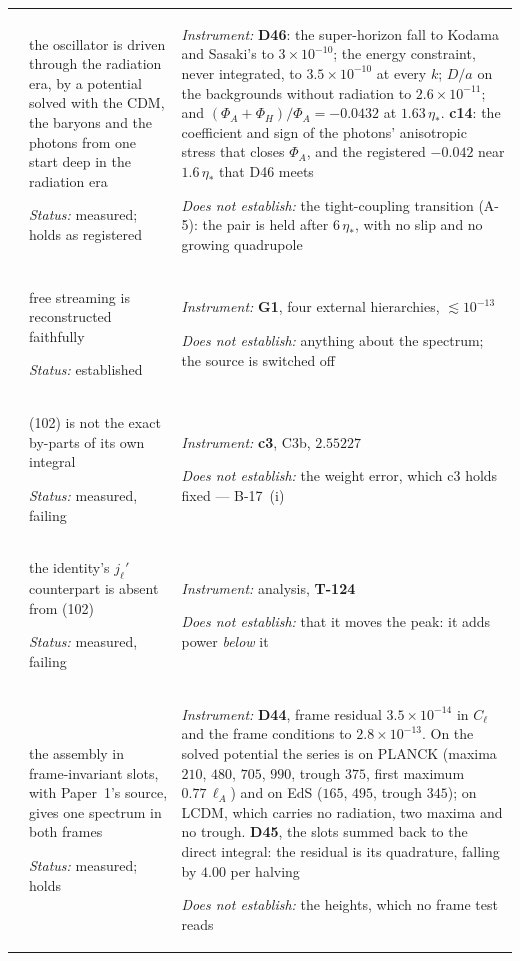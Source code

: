 \begin{longtable}{@{}>{\raggedright\arraybackslash}p{11mm}
                      >{\raggedright\arraybackslash}p{64mm}
                      >{\raggedright\arraybackslash}p{77mm}@{}}
\addlinespace[4pt]
4 & the oscillator is driven through the radiation era, by a potential solved with the CDM, the baryons and the photons from one start deep in the radiation era\par\emph{Status:} measured; holds as registered & \emph{Instrument:} \textbf{D46}: the super-horizon fall to Kodama and Sasaki's to $3\times10^{-10}$; the energy constraint, never integrated, to $3.5\times10^{-10}$ at every $k$; $D/a$ on the backgrounds without radiation to $2.6\times10^{-11}$; and $(\Phi_A+\Phi_H)/\Phi_A=-0.0432$ at $1.63\,\eta_*$. \textbf{c14}: the coefficient and sign of the photons' anisotropic stress that closes $\Phi_A$, and the registered $-0.042$ near $1.6\,\eta_*$ that D46 meets\par\emph{Does not establish:} the tight-coupling transition (A-5): the pair is held after $6\,\eta_*$, with no slip and no growing quadrupole \\
\addlinespace[4pt]
5 & free streaming is reconstructed faithfully\par\emph{Status:} established & \emph{Instrument:} \textbf{G1}, four external hierarchies, $\lesssim10^{-13}$\par\emph{Does not establish:} anything about the spectrum; the source is switched off \\
\addlinespace[4pt]
6 & (102) is not the exact by-parts of its own integral\par\emph{Status:} measured, failing & \emph{Instrument:} \textbf{c3}, C3b, $2.55227$\par\emph{Does not establish:} the weight error, which c3 holds fixed --- B-17~(i) \\
\addlinespace[4pt]
6 & the identity's $j_\ell'$ counterpart is absent from (102)\par\emph{Status:} measured, failing & \emph{Instrument:} analysis, \textbf{T-124}\par\emph{Does not establish:} that it moves the peak: it adds power \emph{below} it \\
\addlinespace[4pt]
6 & the assembly in frame-invariant slots, with Paper~1's source, gives one spectrum in both frames\par\emph{Status:} measured; holds & \emph{Instrument:} \textbf{D44}, frame residual $3.5\times10^{-14}$ in $C_\ell$ and the frame conditions to $2.8\times10^{-13}$. On the solved potential the series is on PLANCK (maxima $210$, $480$, $705$, $990$, trough $375$, first maximum $0.77\,\ell_A$) and on EdS ($165$, $495$, trough $345$); on LCDM, which carries no radiation, two maxima and no trough. \textbf{D45}, the slots summed back to the direct integral: the residual is its quadrature, falling by $4.00$ per halving\par\emph{Does not establish:} the heights, which no frame test reads \\

\end{longtable}
